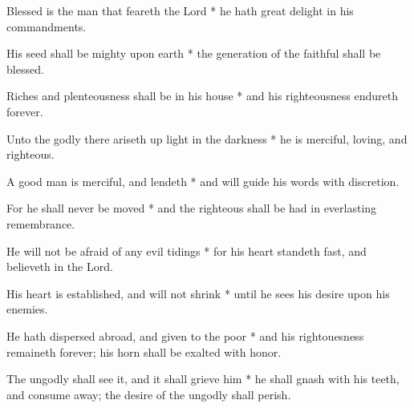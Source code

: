 Blessed is the man that feareth the Lord * he hath great delight in his commandments.

His seed shall be mighty upon earth * the generation of the faithful shall be blessed.
	
Riches and plenteousness shall be in his house * and his righteousness endureth forever.
	
Unto the godly there ariseth up light in the darkness * he is merciful, loving, and righteous.
	
A good man is merciful, and lendeth * and will guide his words with discretion.
	
For he shall never be moved * and the righteous shall be had in everlasting remembrance.
	
He will not be afraid of any evil tidings * for his heart standeth fast, and believeth in the Lord.
	
His heart is established, and will not shrink * until he sees his desire upon his enemies.
	
He hath dispersed abroad, and given to the poor * and his rightouesness remaineth forever; his horn shall be exalted with honor.
	
The ungodly shall see it, and it shall grieve him * he shall gnash with his teeth, and consume away; the desire of the ungodly shall perish.